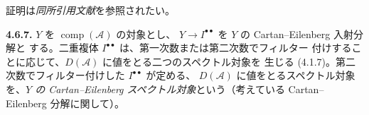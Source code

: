 証明は\emph{同所引用文献}を参照されたい。

\medskip\noindent\textbf{4.6.7.}\quad
$Y$ を $\operatorname{comp}(\mathcal A)$ の対象とし、
$Y\longrightarrow I^{\bullet\bullet}$ を $Y$ の Cartan--Eilenberg 入射分解と
する。二重複体 $I^{\bullet\bullet}$ は、第一次数または第二次数でフィルター
付けすることに応じて、$D(\mathcal A)$ に値をとる二つのスペクトル対象を
生じる (4.1.7)。第二次数でフィルター付けした $I^{\bullet\bullet}$ が定める、
$D(\mathcal A)$ に値をとるスペクトル対象を、\emph{$Y$ の
Cartan--Eilenberg スペクトル対象}という（考えている Cartan--Eilenberg
分解に関して）。
\endgroup
